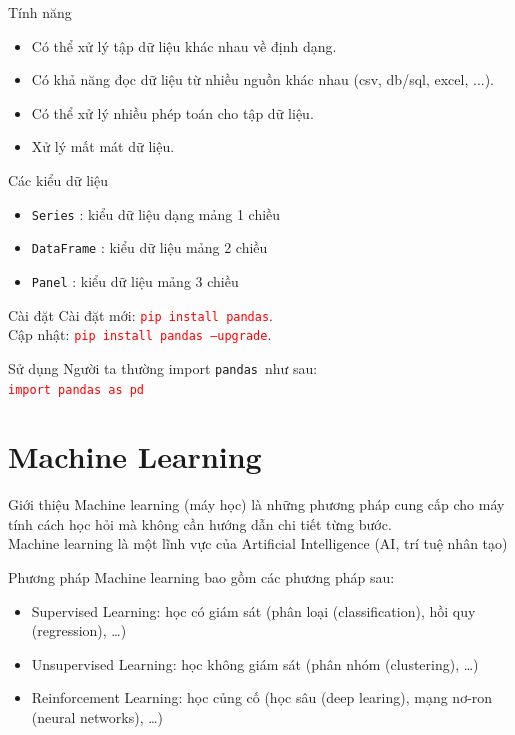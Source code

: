 \documentclass[11pt]{beamer}
\newcommand{\pandas}{\texttt{pandas}}
\begin{document}
		\begin{frame}{Tính năng}
			\begin{itemize}
				\item Có thể xử lý tập dữ liệu khác nhau về định dạng.
				\item Có khả năng đọc dữ liệu từ nhiều nguồn khác nhau (csv, db/sql, excel, ...).
				\item Có thể xử lý nhiều phép toán cho tập dữ liệu.
				\item Xử lý mất mát dữ liệu.
			\end{itemize}
		\end{frame}

	\begin{frame}{Các kiểu dữ liệu}
		\begin{itemize}
			\item \texttt{Series} : kiểu dữ liệu dạng mảng 1 chiều
			\item \texttt{DataFrame} : kiểu dữ liệu mảng 2 chiều
			\item \texttt{Panel} : kiểu dữ liệu mảng 3 chiều
		\end{itemize}
	\end{frame}

	\begin{frame}{Cài đặt}
		Cài đặt mới: \textcolor{red}{\texttt{pip install pandas}}.\\
		Cập nhật: \textcolor{red}{\texttt{pip install pandas --upgrade}}.
	\end{frame}

	\begin{frame}{Sử dụng}
		Người ta thường import \pandas\ như sau:\\
		\centering
		\textcolor{red}{\texttt{import pandas as pd}}
	\end{frame}

	\section{Machine Learning}
	\begin{frame}{Giới thiệu}
		Machine learning (máy học) là những phương pháp cung cấp cho máy tính cách học hỏi mà không cần hướng dẫn chi tiết từng bước.\\
		Machine learning là một lĩnh vực của Artificial Intelligence (AI, trí tuệ nhân tạo)
	\end{frame}

	\begin{frame}{Phương pháp}
	Machine learning bao gồm các phương pháp sau:
		\begin{itemize}
			\item Supervised Learning: học có giám sát (phân loại (classification), hồi quy (regression), \dots)
			\item Unsupervised Learning: học không giám sát (phân nhóm (clustering), \dots)
			\item Reinforcement Learning: học củng cố (học sâu (deep learing), mạng nơ-ron (neural networks), \dots)
		\end{itemize}
	\end{frame}
\end{document}
